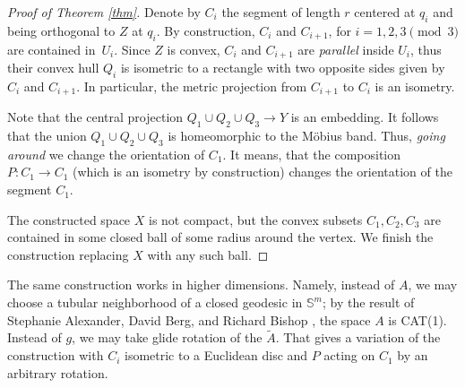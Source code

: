 \documentclass[a4paper,10pt]{article}
\begin{document}
\begin{proof}[Proof of Theorem \ref{thm}]
Denote by $C_i$ the segment of length $r$ centered at $q_i$ and being orthogonal to $Z$ at $q_i$.
By construction, $C_i$ and $C_{i+1}$, for $i=1,2,3\pmod 3$   are contained in~$U_i$.
Since $Z$ is convex, $C_i$ and $C_{i+1}$ are \emph{parallel} inside $U_i$, thus their convex hull  $Q_i$ is isometric to a rectangle with two opposite sides given by $C_i$ and $C_{i+1}$.
In particular, the metric projection from $C_{i+1}$ to $C_{i}$ is an isometry.

Note that the central projection $Q_1\cup Q_2\cup Q_3\to Y$ is an embedding.
It follows that the union $Q_1\cup Q_2\cup Q_3$ is homeomorphic to the Möbius band.
Thus, \emph{going around} we change the orientation of $C_1$.
It means, that the composition $P:C_1\to C_1$ (which is an isometry by construction) changes the orientation of the 
segment $C_1$.

The constructed space $X$ is not compact, but  the convex subsets $C_1,C_2,C_3$ are contained in some closed  ball of some radius around the vertex.  We finish the construction replacing $X$ with any such ball.	
\end{proof}

The same construction works in higher dimensions.
Namely, instead of $A$, we may choose a tubular neighborhood of a closed geodesic in $\mathbb{S}^m$;
by the result of Stephanie Alexander,  David Berg, and Richard Bishop \cite{ABB-1993}, the space $A$ is CAT(1).
Instead of $g$, we may take glide rotation of the $\tilde A$.
That gives a variation of the construction with $C_i$ isometric to a Euclidean disc and $P$ acting on $C_1$ by an arbitrary rotation.

{\sloppy
\printbibliography[heading=bibintoc]
\fussy
}
\end{document}
